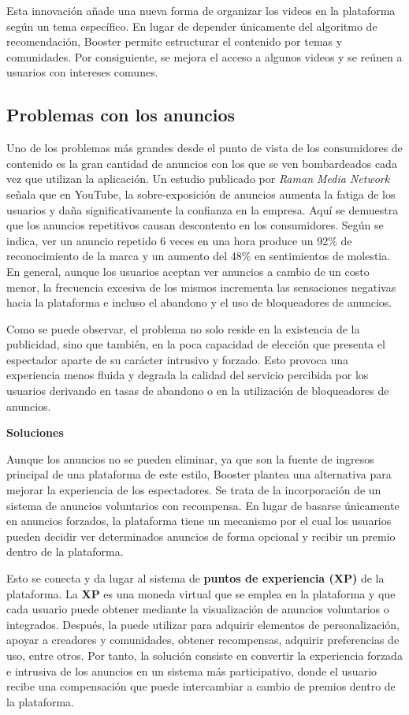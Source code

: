 Esta innovación añade una nueva forma de organizar los videos en la plataforma según un tema específico. En lugar de depender únicamente del algoritmo de recomendación, Booster permite estructurar el contenido por temas y comunidades. Por consiguiente, se mejora el acceso a algunos videos y se reúnen a usuarios con intereses comunes. 


\subsection{Problemas con los anuncios}

Uno de los problemas más grandes desde el punto de vista de los consumidores de contenido es la gran cantidad de anuncios con los que se ven bombardeados cada vez que utilizan la aplicación. Un estudio publicado por \textit{Raman Media Network} \cite{rmn-ad} señala que en YouTube, la sobre-exposición de anuncios aumenta la fatiga de los usuarios y daña significativamente la confianza en la empresa. Aquí se demuestra que los anuncios repetitivos causan descontento en los consumidores. Según se indica, ver un anuncio repetido 6 veces en una hora produce un 92\% de reconocimiento de la marca y un aumento del 48\% en sentimientos de molestia. En general, aunque los usuarios aceptan ver anuncios a cambio de un costo menor, la frecuencia excesiva de los mismos incrementa las sensaciones negativas hacia la plataforma e incluso el abandono y el uso de bloqueadores de anuncios.

Como se puede observar, el problema no solo reside en la existencia de la publicidad, sino que también, en la poca capacidad de elección que presenta el espectador aparte de su carácter intrusivo y forzado. Esto provoca una experiencia menos fluida y degrada la calidad del servicio percibida por los usuarios derivando en tasas de abandono o en la utilización de bloqueadores de anuncios.  

\textbf{Soluciones}

Aunque los anuncios no se pueden eliminar, ya que son la fuente de ingresos principal de una plataforma de este estilo, Booster plantea una alternativa para mejorar la experiencia de los espectadores. Se trata de la incorporación de un sistema de anuncios voluntarios con recompensa. En lugar de basarse únicamente en anuncios forzados, la plataforma tiene un mecanismo por el cual los usuarios pueden decidir ver determinados anuncios de forma opcional y recibir un premio dentro de la plataforma.

Esto se conecta y da lugar al sistema de \textbf{puntos de experiencia (XP)} de la plataforma. La \textbf{XP} es una moneda virtual que se emplea en la plataforma y que cada usuario puede obtener mediante la visualización de anuncios voluntarios o integrados. Después, la puede utilizar para adquirir elementos de personalización, apoyar a creadores y comunidades, obtener recompensas, adquirir preferencias de uso, entre otros. Por tanto, la solución consiste en convertir la experiencia forzada e intrusiva de los anuncios en un sistema más participativo, donde el usuario recibe una compensación que puede intercambiar a cambio de premios dentro de la plataforma.





